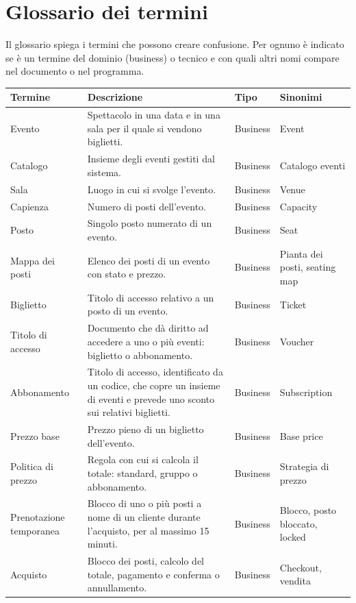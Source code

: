 \section{Glossario dei termini}
\label{sec:glossario}

Il glossario spiega i termini che possono creare confusione. Per ognuno è indicato se è un termine del dominio (business) o tecnico e con quali altri nomi compare nel documento o nel programma.

\small
\begin{center}
\begin{tabular}{@{}L{2.9cm}L{7.0cm}L{1.5cm}L{3.0cm}@{}}
\toprule
\textbf{Termine} & \textbf{Descrizione} & \textbf{Tipo} & \textbf{Sinonimi} \\
\midrule
Evento & Spettacolo in una data e in una sala per il quale si vendono biglietti. & Business & Event \\
Catalogo & Insieme degli eventi gestiti dal sistema. & Business & Catalogo eventi \\
Sala & Luogo in cui si svolge l'evento. & Business & Venue \\
Capienza & Numero di posti dell'evento. & Business & Capacity \\
Posto & Singolo posto numerato di un evento. & Business & Seat \\
Mappa dei posti & Elenco dei posti di un evento con stato e prezzo. & Business & Pianta dei posti, seating map \\
Biglietto & Titolo di accesso relativo a un posto di un evento. & Business & Ticket \\
Titolo di accesso & Documento che dà diritto ad accedere a uno o più eventi: biglietto o abbonamento. & Business & Voucher \\
Abbonamento & Titolo di accesso, identificato da un codice, che copre un insieme di eventi e prevede uno sconto sui relativi biglietti. & Business & Subscription \\
Prezzo base & Prezzo pieno di un biglietto dell'evento. & Business & Base price \\
Politica di prezzo & Regola con cui si calcola il totale: standard, gruppo o abbonamento. & Business & Strategia di prezzo \\
Prenotazione temporanea & Blocco di uno o più posti a nome di un cliente durante l'acquisto, per al massimo 15 minuti. & Business & Blocco, posto bloccato, locked \\
Acquisto & Blocco dei posti, calcolo del totale, pagamento e conferma o annullamento. & Business & Checkout, vendita \\

\end{tabular}
\end{center}
